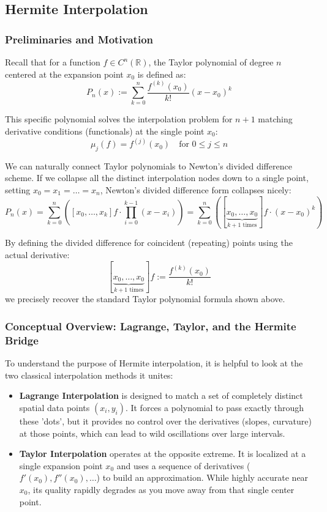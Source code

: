 \documentclass{article}
\begin{document}
\subsection{Hermite Interpolation}

\subsubsection{Preliminaries and Motivation}
Recall that for a function $f \in C^n(\mathbb{R})$, the Taylor polynomial of degree $n$ centered at the expansion point $x_0$ is defined as:
\[P_n(x) := \sum_{k=0}^n \frac{f^{(k)} (x_0)}{k!}(x-x_0)^k\]

This specific polynomial solves the interpolation problem for $n+1$ matching derivative conditions (functionals) at the single point $x_0$:
\[\mu_j(f) = f^{(j)}(x_0) \quad \text{for } 0 \leq j \leq n\]

We can naturally connect Taylor polynomials to Newton's divided difference scheme. If we collapse all the distinct interpolation nodes down to a single point, setting $x_0 = x_1 = \dots = x_n$, Newton's divided difference form collapses nicely:
\[P_n(x) = \sum_{k=0}^n \left( [x_0,\dots,x_k]f \cdot \prod_{i=0}^{k-1}(x-x_i) \right) = \sum_{k=0}^n \left( [\underbrace{x_0,\dots,x_0}_{k+1 \text{ times}}]f \cdot (x-x_0)^k \right)\]

By defining the divided difference for coincident (repeating) points using the actual derivative:
\[[\underbrace{x_0,\dots,x_0}_{k + 1 \text{ times}}]f := \frac{f^{(k)}(x_0)}{k!}\]
we precisely recover the standard Taylor polynomial formula shown above.
\subsubsection{Conceptual Overview: Lagrange, Taylor, and the Hermite Bridge}
To understand the purpose of Hermite interpolation, it is helpful to look at the two classical interpolation methods it unites:

\begin{itemize}
    \item \textbf{Lagrange Interpolation} is designed to match a set of completely distinct spatial data points $(x_i, y_i)$. It forces a polynomial to pass exactly through these 'dots', but it provides no control over the derivatives (slopes, curvature) at those points, which can lead to wild oscillations over large intervals.
    \item \textbf{Taylor Interpolation} operates at the opposite extreme. It is localized at a single expansion point $x_0$ and uses a sequence of derivatives ($f'(x_0), f''(x_0), \dots$) to build an approximation. While highly accurate near $x_0$, its quality rapidly degrades as you move away from that single center point.
\end{itemize}
\end{document}
